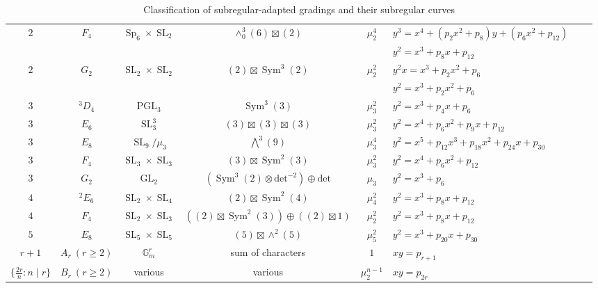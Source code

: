 \documentclass{article} %
\numberwithin{equation}{section}
\theoremstyle{definition}
\newcommand{\G}{\mathbb{G}}
\DeclareMathOperator{\GL}{GL}
\DeclareMathOperator{\PGL}{PGL}
\DeclareMathOperator{\SL}{SL}
\DeclareMathOperator{\Sp}{Sp}
\DeclareMathOperator{\Sym}{Sym}
\newcommand{\rl}{r} %
\begin{document}
{\begin{landscape}
\begin{table}
\begin{center}
\begin{tabular}{|c|c|c|c|c|l|c|c|}
    $2$ & $F_4$ & $\Sp_6\times \SL_2$ & $\wedge^3_0(6)\boxtimes (2)$ & $\mu_2^4$ & $y^3 = x^4+(p_2x^2+p_8)y + (p_6x^2+p_{12})$  & \cite{Laga-F4paper} \\ 
    &  & &  & & $y^2 = x^3 + p_8x + p_{12}$  & \cite{Laga-F4paper} \\
    $2$ & $G_2$ & $\SL_2\times \SL_2$ & $(2)\boxtimes \Sym^3(2)$ &  $\mu_2^2$ & $y^2x = x^3 + p_2x^2+p_6$ & \cite{BhargavaHo-2Selmergroupsofsomefamilies} \\ 
     &  &  &  & &  $y^2 = x^3 + p_2x^2+p_6$  &  \\
    \hline
	$3$ &  $^3D_4$ & $\PGL_3$ & $\Sym^3(3)$ &  $\mu_3^2$ & $y^2 = x^3 + p_4 x + p_6$  & \cite{BS-3Selmer}\\
    $3$ & $E_6$ & $\SL_3^3 $ & $(3)\boxtimes(3)\boxtimes (3)$  & $\mu_3^2$ & $y^2 = x^4 + p_{6} x^2 +p_9 x +p_{12}$   & \cite{BhargavaHo-coregularspacesgenusone}\\
    $3$ & $E_8$ & $\SL_9/\mu_3 $ & $\bigwedge^3(9)$  & $\mu_3^4$ & $y^2 =x^5+p_{12}x^3+p_{18}x^2+p_{24}x + p_{30}$  & \cite{Thorne-Romano-E8} \\
    $3$ & $F_4$ & $\SL_3 \times \SL_3$ & $(3)\boxtimes \Sym^2(3)$ & $\mu_3^2$ & $y^2 = x^4 + p_{6} x^2 + p_{12}$   & \cite{BhargavaHo-coregularspacesgenusone}\\
    $3$ & $G_2$ & $\GL_2 $ & $(\Sym^3(2)\otimes \text{det}^{-2}) \oplus \text{det}$ & $\mu_3$ & $y^2 = x^3 + p_{6}$  & \cite{BhargavaElkiesShnidman}\\
	\hline
    $4$ & $^2E_6$ & $\SL_2\times \SL_4$ & $(2)\boxtimes \Sym^2(4)$ & $\mu_4^2$ & $y^2 = x^3 + p_{8}x+p_{12}$ &  \cite{BS-4Selmer} \\
    $4$ & $F_4$ & $\SL_2\times \SL_3$ & $((2) \boxtimes \Sym^2(3)) \oplus ((2) \boxtimes 1)$ & $\mu_2^2$ & $y^2 = x^3+p_8x+p_{12}$ &  \\ 
    \hline
    $5$ & $E_8$ & $\SL_5\times \SL_5$ & $(5)\boxtimes \wedge^2(5)$ & $\mu_5^2$ & $y^2 = x^3 + p_{20}x + p_{30}$  & \cite{BS-5Selmer, Fisher-invarianttheorynormalquinticI} \\
    \hline
    $\rl +1$ & $A_\rl\: (\rl\geq 2)$ & $\G_m^\rl$ & sum of characters & $1$ & $xy = p_{\rl+1}$  &   \\
    $\{\frac{2\rl}{n}\colon n\mid \rl\}$ & $B_\rl\: (\rl\geq 2)$ & various & various & $\mu_2^{n-1}$ & $xy = p_{2\rl}$  &   \\
    \hline
	\end{tabular}
\end{center}
\caption{Classification of subregular-adapted gradings and their subregular curves}\label{table:examples intro}
\end{table}


\end{landscape}
}
\restoregeometry
\vspace{.1in}
\end{document}
